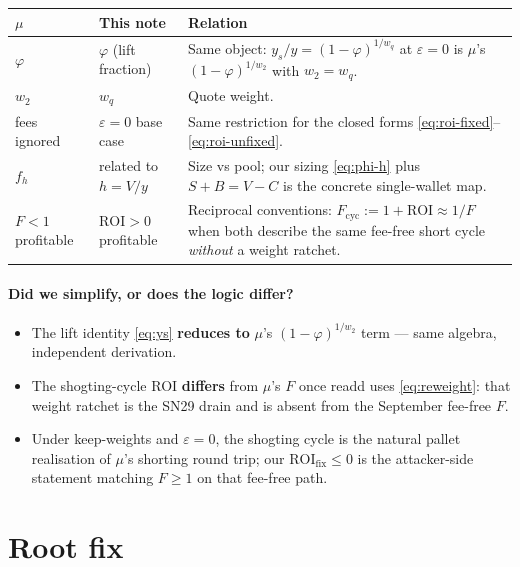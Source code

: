 \documentclass[11pt]{article}
\theoremstyle{definition}
\theoremstyle{remark}
\begin{document}
\begin{center}
\begin{tabular}{@{}llp{}@{}}
\toprule
$\mu$ & This note & Relation \\
\midrule
$\varphi$ & $\varphi$ (lift fraction) &
  Same object: $y_s/y=(1-\varphi)^{1/w_q}$ at $\varepsilon=0$ is
  $\mu$'s $(1-\varphi)^{1/w_2}$ with $w_2=w_q$. \\
$w_2$ & $w_q$ & Quote weight. \\
fees ignored & $\varepsilon=0$ base case & Same restriction for the
  closed forms \eqref{eq:roi-fixed}--\eqref{eq:roi-unfixed}. \\
$f_h$ & related to $h=V/y$ &
  Size vs pool; our sizing \eqref{eq:phi-h} plus $S+B=V-C$ is the
  concrete single-wallet map. \\
$F<1$ profitable & $\mathrm{ROI}>0$ profitable &
  Reciprocal conventions:
  $F_{\mathrm{cyc}}:=1+\mathrm{ROI}\approx 1/F$ when both describe the
  same fee-free short cycle \emph{without} a weight ratchet. \\
\bottomrule
\end{tabular}
\end{center}

\paragraph{Did we simplify, or does the logic differ?}
\begin{itemize}
  \item The lift identity \eqref{eq:ys} \textbf{reduces to} $\mu$'s
        $(1-\varphi)^{1/w_2}$ term --- same algebra, independent
        derivation.
  \item The shogting-cycle ROI \textbf{differs} from $\mu$'s $F$ once
        readd uses \eqref{eq:reweight}: that weight ratchet is the SN29
        drain and is absent from the September fee-free $F$.
  \item Under keep-weights and $\varepsilon=0$, the shogting cycle is
        the natural pallet realisation of $\mu$'s shorting round trip;
        our $\mathrm{ROI}_{\mathrm{fix}}\le 0$ is the attacker-side
        statement matching $F\ge 1$ on that fee-free path.
\end{itemize}

\section{Root fix}
\label{sec:fix}
\end{document}
